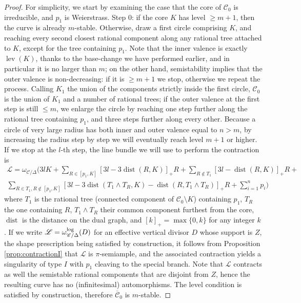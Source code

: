 \documentclass[11pt]{amsart}
\newcommand{\dvr}{\Delta}
\newcommand{\dist}{\operatorname{dist}}
\newcommand{\lev}{\operatorname{lev}}
\theoremstyle{plain}
\theoremstyle{definition}
\begin{document}
\begin{proof}
  For simplicity, we start by examining the case that the core of $\mathcal C_0$ is irreducible, and $p_1$ is Weierstrass. Step $0$: if the core $K$ has level $\geq m+1$, then the curve is already $m$-stable. Otherwise, draw a first circle comprising $K$, and reaching every second closest rational component along any rational tree attached to $K$, except for the tree containing $p_1$. Note that the inner valence is exactly $\lev(K)$, thanks to the base-change we have performed earlier, and in particular it is no larger than $m$; on the other hand, semistability implies that the outer valence is non-decreasing: if it is $\geq m+1$ we stop, otherwise we repeat the process. Calling $K_1$ the union of the components strictly inside the first circle, $\mathcal C_0$ is the union of $K_1$ and a number of rational trees; if the outer valence at the first step is still $\leq m$, we enlarge the circle by reaching one step further along the rational tree containing $p_1$, and three steps further along every other. Because a circle of very large radius has both inner and outer valence equal to $n>m$, by increasing the radius step by step we will eventually reach level $m+1$ or higher. If we stop at the $l$-th step, the line bundle we will use to perform the contraction is
  \begin{multline*}
  \mathcal L=\omega_{\mathcal C/\dvr}(3l K + \sum_{R\in [p_1,K]}[3l-3\dist(R,K)]_+R +\sum_{R\notin T_1}[3l-\dist(R,K)]_+R +\\
  \sum_{R\in T_1,R\notin [p_1,K]}[3l-3\dist(T_1\wedge T_R,K)-\dist(R,T_1\wedge T_R)]_+R+ \sum_{i=1}^np_i)
  \end{multline*}
  where $T_1$ is the rational tree (connected component of $\mathcal C_0\setminus K$) containing $p_1$, $T_R$ the one containing $R$, $T_1\wedge T_R$ their common component furthest from the core, $\dist$ is the distance on the dual graph, and $[k]_+=\max\{0,k\}$ for any integer $k$. If we write $\mathcal L=\omega_{\mathcal C/\dvr}^{\rm{log}}(D)$ for an effective vertical divisor $D$ whose support is $Z$, the shape prescription being satisfied by construction, it follows from Proposition \ref{prop:contractionI} that $\mathcal L$ is $\pi$-semiample, and the associated contraction yields a singularity of type $I$ with $p_1$ cleaving to the special branch. Note that $\mathcal L$ contracts as well the semistable rational components that are disjoint from $Z$, hence the resulting curve has no (infinitesimal) automorphisms. The level condition is satisfied by construction, therefore $\overline{\mathcal C}_0$ is $m$-stable.
  

\end{proof}
\end{document}
